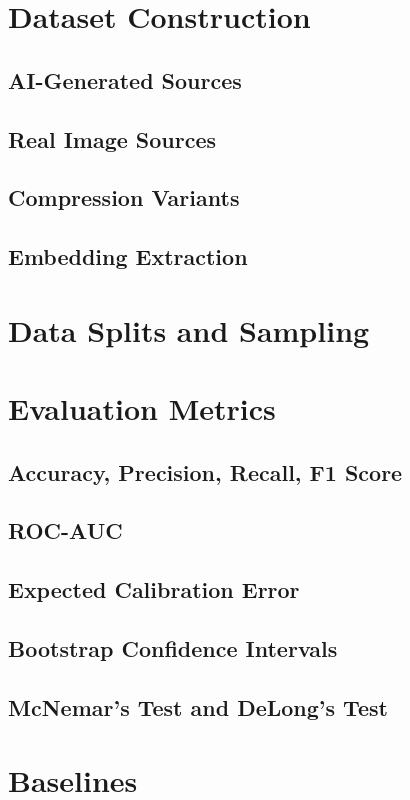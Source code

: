 \documentclass[12pt,a4paper]{book}
\theoremstyle{definition}
\theoremstyle{remark}
\begin{document}
\section{Dataset Construction}\label{sec:dataset}
\subsection{AI-Generated Sources}
\subsection{Real Image Sources}
\subsection{Compression Variants}
\subsection{Embedding Extraction}

\section{Data Splits and Sampling}\label{sec:splits}

\section{Evaluation Metrics}\label{sec:metrics}
\subsection{Accuracy, Precision, Recall, F1 Score}
\subsection{ROC-AUC}
\subsection{Expected Calibration Error}
\subsection{Bootstrap Confidence Intervals}
\subsection{McNemar's Test and DeLong's Test}

\section{Baselines}\label{sec:baselines}
\end{document}
